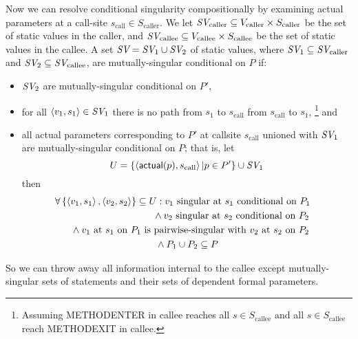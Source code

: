 \documentclass[11pt,notitlepage]{article}
\newcommand{\bigvar}[1]{\ensuremath{\text{\it #1}}}
\newcommand{\func}[1]{\ensuremath{\text{\sffamily #1}}}
\begin{document}
Now we can resolve conditional singularity compositionally by
examining actual parameters at a call-site $s_\text{call}\in S_\text{caller}$.
We let 
$\bigvar{SV}_\text{caller} \subseteq 
  V_\text{caller} \times S_\text{caller}$
be the set of static values in the caller, and
$\bigvar{SV}_\text{callee} \subseteq 
  V_\text{callee} \times S_\text{callee}$
be the set of static values in the callee.
A set $\bigvar{SV}=\bigvar{SV}_1 \cup \bigvar{SV}_2$ of static values,
where $\bigvar{SV}_1\subseteq \bigvar{SV}_\text{caller}$ and
      $\bigvar{SV}_2\subseteq \bigvar{SV}_\text{callee}$,
are mutually-singular conditional on $P$ if:
\begin{itemize}
\item $\bigvar{SV}_2$ are mutually-singular conditional on $P'$,
\item for all $\tuple{v_1,s_1}\in\bigvar{SV}_1$
there is no path from $s_1$ to $s_\text{call}$
             from $s_\text{call}$ to $s_1$,%
\footnote{Assuming METHOD\-ENTER in callee reaches all 
          $s\in S_\text{callee}$ and
          all $s\in S_\text{callee}$ reach METHOD\-EXIT in callee.}
and
\item all actual parameters corresponding to $P'$ at callsite $s_\text{call}$
  unioned with $\bigvar{SV}_1$ are mutually-singular conditional on $P$;
  that is, let
\begin{displaymath}
U = 
\left\{\tuple{\func{actual}(p), s_\text{call}} | p \in P' \right\}
    \cup
\bigvar{SV}_1
\end{displaymath}
then
\begin{multline*}
\forall \left\{\tuple{v_1,s_1},\tuple{v_2,s_2}\right\} \subseteq U :
\hfill
v_1 \text{ singular at } s_1 \text{ conditional on } P_1
\mspace{-2mu}\quad\\\shoveright{{}\wedge
v_2 \text{ singular at } s_2 \text{ conditional on } P_2
}\\\shoveright{{}\wedge
v_1 \text{ at } s_1 \text{ on } P_1
\text{ is pairwise-singular with }
v_2 \text{ at } s_2 \text{ on } P_2
}\\{}\wedge
P_1 \cup P_2 \subseteq P
\end{multline*}
\end{itemize}

So we can throw away all information internal to the callee except
mutually-singular sets of statements and their sets of dependent
formal parameters.

\end{document}
